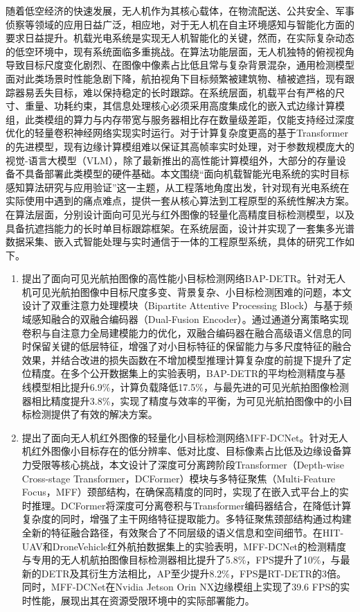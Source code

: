 
\begin{chineseabstract}

随着低空经济的快速发展，无人机作为其核心载体，在物流配送、公共安全、军事侦察等领域的应用日益广泛，相应地，对于无人机在自主环境感知与智能化方面的要求日益提升。机载光电系统是实现无人机智能化的关键，然而，在实际复杂动态的低空环境中，现有系统面临多重挑战。在算法功能层面，无人机独特的俯视视角导致目标尺度变化剧烈、在图像中像素占比低且常与复杂背景混杂，通用检测模型面对此类场景时性能急剧下降，航拍视角下目标频繁被建筑物、植被遮挡，现有跟踪器易丢失目标，难以保持稳定的长时跟踪。在系统层面，机载平台有严格的尺寸、重量、功耗约束，其信息处理核心必须采用高度集成化的嵌入式边缘计算模组，此类模组的算力与内存带宽与服务器相比存在数量级差距，仅能支持经过深度优化的轻量卷积神经网络实现实时运行。对于计算复杂度更高的基于Transformer的先进模型，现有边缘计算模组难以保证其高帧率实时处理，对于参数规模庞大的视觉-语言大模型（VLM），除了最新推出的高性能计算模组外，大部分的存量设备不具备部署此类模型的硬件基础。本文围绕“面向机载智能光电系统的实时目标感知算法研究与应用验证”这一主题，从工程落地角度出发，针对现有光电系统在实际使用中遇到的痛点难点，提供一套从核心算法到工程原型的系统性解决方案。在算法层面，分别设计面向可见光与红外图像的轻量化高精度目标检测模型，以及具备抗遮挡能力的长时单目标跟踪框架。在系统层面，设计并实现了一套集多光谱数据采集、嵌入式智能处理与实时通信于一体的工程原型系统，具体的研究工作如下。

\begin{enumerate}[wide,]
    \item 提出了面向可见光航拍图像的高性能小目标检测网络BAP-DETR。针对无人机可见光航拍图像中目标尺度多变、背景复杂、小目标检测困难的问题，本文设计了双重注意力处理模块（Bipartite Attentive Processing Block）与基于频域感知融合的双融合编码器（Dual-Fusion Encoder）。通过通道分离策略实现卷积与自注意力全局建模能力的优化，双融合编码器在融合高级语义信息的同时保留关键的低层特征，增强了对小目标特征的保留能力与多尺度特征的融合效果，并结合改进的损失函数在不增加模型推理计算复杂度的前提下提升了定位精度。在多个公开数据集上的实验表明，BAP-DETR的平均检测精度与基线模型相比提升6.9\%，计算负载降低17.5\%，与最先进的可见光航拍图像检测器相比精度提升3.8\%，实现了精度与效率的平衡，为可见光航拍图像中的小目标检测提供了有效的解决方案。

    \item 提出了面向无人机红外图像的轻量化小目标检测网络MFF-DCNet。针对无人机红外图像小目标存在的低分辨率、低对比度、目标像素占比低及边缘设备算力受限等核心挑战，本文设计了深度可分离跨阶段Transformer（Depth-wise Cross-stage Transformer，DCFormer）模块与多特征聚焦（Multi-Feature Focus，MFF）颈部结构，在确保高精度的同时，实现了在嵌入式平台上的实时推理。DCFormer将深度可分离卷积与Transformer编码器结合，在降低计算复杂度的同时，增强了主干网络特征提取能力。多特征聚焦颈部结构通过构建全新的特征融合路径，有效聚合了不同层级的语义信息和空间细节。在HIT-UAV和DroneVehicle红外航拍数据集上的实验表明，MFF-DCNet的检测精度与专用的无人机航拍图像目标检测器相比提升了5.8\%，FPS提升了10\%，与最新的DETR及其衍生方法相比，AP至少提升8.2\%，FPS是RT-DETR的3倍。同时，MFF-DCNet在Nvidia Jetson Orin NX边缘模组上实现了39.6 FPS的实时性能，展现出其在资源受限环境中的实际部署能力。


\end{enumerate}
\end{chineseabstract}
